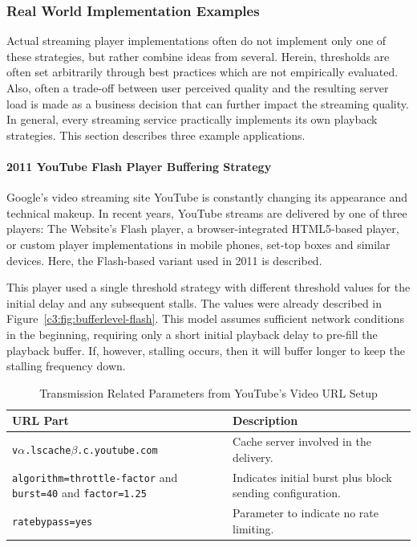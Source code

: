 \subsubsection{Real World Implementation Examples}

Actual streaming player implementations often do not implement only one of these strategies, but rather combine ideas from several. Herein, thresholds are often set arbitrarily through best practices which are not empirically evaluated. Also, often a trade-off between user perceived quality and the resulting server load is made as a business decision that can further impact the streaming quality. In general, every streaming service practically implements its own playback strategies. This section describes three example applications.

\paragraph{2011 YouTube Flash Player Buffering Strategy}

Google's video streaming site YouTube is constantly changing its appearance and technical makeup. In recent years, YouTube streams are delivered by one of three players: The Website's Flash player, a browser-integrated \acrshort{HTML}5-based player, or custom player implementations in mobile phones, set-top boxes and similar devices. Here, the Flash-based variant used in 2011 is described.

This player used a single threshold strategy with different threshold values for the initial delay and any subsequent stalls. The values were already described in Figure~\ref{c3:fig:bufferlevel-flash}. This model assumes sufficient network conditions in the beginning, requiring only a short initial playback delay to pre-fill the playback buffer. If, however, stalling occurs, then it will buffer longer to keep the stalling frequency down.

\begin{table}[htb]
\caption{Transmission Related Parameters from YouTube's Video URL Setup}
\label{c3:tbl:yturl}
	\centering
	\begin{tabu}{X[l]X}
		\toprule
		\textbf{\gls{URL} Part} & \textbf{Description} \\ 
		\midrule
		\texttt{v$\alpha$.lscache$\beta$.c.youtube.com} &  Cache server involved in the delivery.\\
		\texttt{algorithm=throttle-factor} and \texttt{burst=40} and \texttt{factor=1.25} & Indicates initial burst plus block sending configuration. \\
		\texttt{ratebypass=yes} & Parameter to indicate no rate limiting.\\
		\bottomrule
	\end{tabu}
\end{table}

